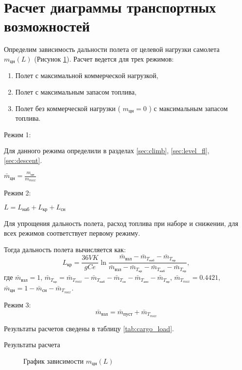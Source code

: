 \section{Расчет диаграммы транспортных возможностей}

Определим зависимость дальности полета от целевой нагрузки самолета $m_{цн}(L)$
(Рисунок \ref{fig:m_L}).
Расчет ведется для трех режимов:
\begin{enumerate}
    \item Полет с максимальной коммерческой нагрузкой,
    \item Полет с максимальным запасом топлива,
    \item Полет без коммерческой нагрузки ( $m_{цн}=0$ ) с максимальным запасом топлива.
\end{enumerate}

Режим 1:

Для данного режима определили в разделах \ref{sec:climb}, \ref{sec:level_fl}, \ref{sec:descent}.

$\bar{m}_{цн} = \frac{m_{цн}}{m_{max}}$

Режим 2:

$ L = L_{наб} + L_{кр} + L_{сн} $

Для упрощения дальность полета, расход топлива при наборе и снижении,
для всех режимов соответствует первому режиму.

Тогда дальность полета вычисляется как:
\begin{equation}
    L_{кр} = \frac{36 V K}{gCe} \ln{\frac{\bar{m}_{взл} - \bar{m}_{T_{наб}} - \bar{m}_{T_{пр}}}{\bar{m}_{взл}-\bar{m}_{T_{кр}}-\bar{m}_{T_{наб}} - \bar{m}_{T_{пр}}}},
\end{equation}
где $ \bar{m}_{взл} = 1 $, $ \bar{m}_{T_{кр}} = \bar{m}_{T_{max}}- \bar{m}_{T_{наб}} - \bar{m}_{T_{сн}} -
\bar{m}_{T_{анз}} - \bar{m}_{T_{пр}} $, $ \bar{m}_{T_{max}} = 0.4421$, $
\bar{m}_{цн} = 1 - \bar{m}_{сн} - \bar{m}_{T_{max}}$.


Режим 3:
\[
    \bar{m}_{взл} = \bar{m}_{пуст} + \bar{m}_{T_{max}}
\]

Результаты расчетов сведены в таблицу \ref{tab:cargo_load}.

\begin{table}[H]
    \centering
    \caption{Результаты расчета}
    \label{tab:cargo_load}
    
\end{table}

\begin{figure}[H]
\centering
\resizebox{.79\linewidth}{!}{}
\caption{График зависимости $m_{цн}(L)$}
\label{fig:m_L}
\end{figure}

